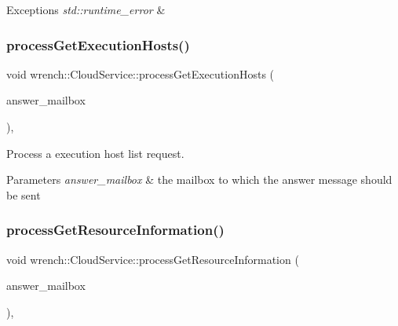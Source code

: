 \begin{DoxyExceptions}{Exceptions}
{\em std\+::runtime\+\_\+error} & \\
\hline
\end{DoxyExceptions}
\mbox{\label{classwrench_1_1_cloud_service_a37ac75ff0e18e6897db13586c3d3ea26}} 
\subsubsection{\texorpdfstring{process\+Get\+Execution\+Hosts()}{processGetExecutionHosts()}}
{\footnotesize\ttfamily void wrench\+::\+Cloud\+Service\+::process\+Get\+Execution\+Hosts (\begin{DoxyParamCaption}\item[{const std\+::string \&}]{answer\+\_\+mailbox }\end{DoxyParamCaption})\hspace{0.3cm}{\ttfamily [protected]}, {\ttfamily [virtual]}}



Process a execution host list request. 


\begin{DoxyParams}{Parameters}
{\em answer\+\_\+mailbox} & the mailbox to which the answer message should be sent \\
\hline
\end{DoxyParams}
\mbox{\label{classwrench_1_1_cloud_service_a2c43daf67784bda636b77e32cdb129bd}} 
\subsubsection{\texorpdfstring{process\+Get\+Resource\+Information()}{processGetResourceInformation()}}
{\footnotesize\ttfamily void wrench\+::\+Cloud\+Service\+::process\+Get\+Resource\+Information (\begin{DoxyParamCaption}\item[{const std\+::string \&}]{answer\+\_\+mailbox }\end{DoxyParamCaption})\hspace{0.3cm}{\ttfamily [protected]}, {\ttfamily [virtual]}}



